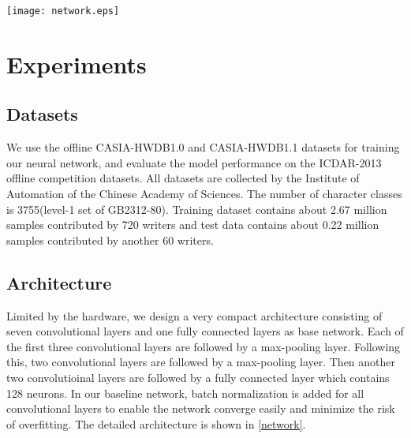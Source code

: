 \documentclass[conference]{IEEEtran}
\begin{document}
\begin{figure*}[!t]
	\centering
	\texttt{[image: network.eps]}
	\caption{Baseline convolutional architecture for template matching problem.}
	\label{network}
\end{figure*}

\section{Experiments}
\label{Experiments}

\subsection{Datasets}
We use the offline CASIA-HWDB1.0 and CASIA-HWDB1.1 datasets for training our neural network, and evaluate the model performance on the ICDAR-2013 offline competition datasets. All datasets are collected by the Institute of Automation of the Chinese Academy of Sciences. The number of character classes is 3755(level-1 set of GB2312-80). Training dataset contains about 2.67 million samples contributed by 720 writers and test data contains about 0.22 million samples contributed by another 60 writers\cite{liu2011casia}.

\subsection{Architecture}
Limited by the hardware, we design a very compact architecture consisting of seven convolutional layers and one fully connected layers as base network. Each of the first three convolutional layers are followed by a max-pooling layer. Following this, two convolutional layers are followed by a max-pooling layer. Then another two convolutioinal layers are followed by a fully connected layer which contains 128 neurons. In our baseline network, batch normalization\cite{ioffe2015batch} is added for all convolutional layers to enable the network converge easily and minimize the risk of overfitting. The detailed architecture is shown in \figurename \ref{network}.
\end{document}
